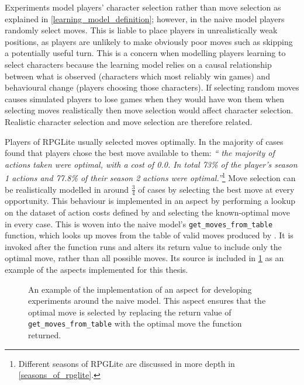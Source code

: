 Experiments model players' character selection rather than move selection as
explained in \cref{learning_model_definition}; however, in the naive model
players randomly select moves. This is liable to place players in
unrealistically weak positions, as players are unlikely to make obviously poor
moves such as skipping a potentially useful turn. This is a concern when
modelling players learning to select characters because the learning model
relies on a causal relationship between what is observed (characters which most
reliably win games) and behavioural change (players choosing those characters).
If selecting random moves causes simulated players to lose games when they would
have won them when selecting moves realistically then move selection would
affect character selection. Realistic character selection and move selection are
therefore related.

Players of RPGLite usually selected moves optimally. In the majority of cases
\citet{kavanagh2021gameplay} found that players chose the best move available to
them: \emph{``\textelp{} the majority of actions taken were optimal, with a cost of
0.0. In total 73\% of the player's season 1 actions and 77.8\% of their season 2
actions were optimal.''}\footnote{Different seasons of RPGLite are discussed in
more depth in \cref{seasons_of_rpglite}.} Move selection can be realistically
modelled in around \(\frac{3}{4}\) of cases by selecting the best move at every
opportunity. This behaviour is implemented in an aspect by performing a lookup on
the dataset of action costs defined by \citet{kavanagh2021gameplay} and
selecting the known-optimal move in every case. This is woven into the naive
model's \lstinline{get_moves_from_table} function, which looks up moves from the
table of valid moves produced by \citet{kavanagh2021thesis}. It is invoked after
the function runs and alters its return value to include only the optimal move,
rather than all possible moves. Its source is included in
\cref{fig:best_move_aspect_source} as an example of the aspects implemented for this
thesis.

\begin{figure}[h]
  \centering
  
  \caption{An example of the implementation of an aspect for developing
  experiments around the naive model. This aspect ensures that the optimal move
  is selected by replacing the return value of \lstinline{get_moves_from_table}
  with the optimal move the function returned.}
  \label{fig:best_move_aspect_source}
\end{figure}

